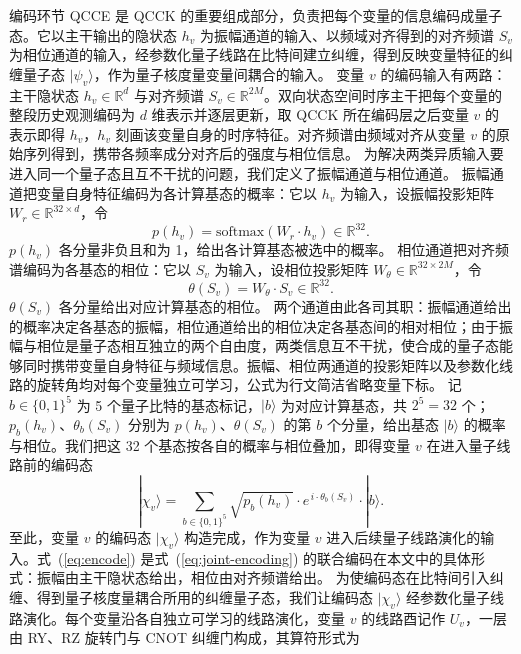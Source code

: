 编码环节 QCCE 是 QCCK 的重要组成部分，负责把每个变量的信息编码成量子态。它以主干输出的隐状态 $h_v$ 为振幅通道的输入、以频域对齐得到的对齐频谱 $S_v$ 为相位通道的输入，经参数化量子线路在比特间建立纠缠，得到反映变量特征的纠缠量子态 $|\psi_v\rangle$，作为量子核度量变量间耦合的输入。
变量 $v$ 的编码输入有两路：主干隐状态 $h_v\in\mathbb{R}^d$ 与对齐频谱 $S_v\in\mathbb{R}^{2M}$。双向状态空间时序主干把每个变量的整段历史观测编码为 $d$ 维表示并逐层更新，取 QCCK 所在编码层之后变量 $v$ 的表示即得 $h_v$，$h_v$ 刻画该变量自身的时序特征。对齐频谱由频域对齐从变量 $v$ 的原始序列得到，携带各频率成分对齐后的强度与相位信息。
为解决两类异质输入要进入同一个量子态且互不干扰的问题，我们定义了振幅通道与相位通道。
振幅通道把变量自身特征编码为各计算基态的概率：它以 $h_v$ 为输入，设振幅投影矩阵 $W_r\in\mathbb{R}^{32\times d}$，令
\begin{equation}
\label{eq:amp-channel}
p(h_v) = \mathrm{softmax}(W_r\cdot h_v) \in \mathbb{R}^{32}.
\end{equation}
$p(h_v)$ 各分量非负且和为 1，给出各计算基态被选中的概率。
相位通道把对齐频谱编码为各基态的相位：它以 $S_v$ 为输入，设相位投影矩阵 $W_\theta\in\mathbb{R}^{32\times 2M}$，令
\begin{equation}
\label{eq:phase-channel}
\theta(S_v) = W_\theta\cdot S_v \in \mathbb{R}^{32}.
\end{equation}
$\theta(S_v)$ 各分量给出对应计算基态的相位。
两个通道由此各司其职：振幅通道给出的概率决定各基态的振幅，相位通道给出的相位决定各基态间的相对相位；由于振幅与相位是量子态相互独立的两个自由度，两类信息互不干扰，使合成的量子态能够同时携带变量自身特征与频域信息。振幅、相位两通道的投影矩阵以及参数化线路的旋转角均对每个变量独立可学习，公式为行文简洁省略变量下标。
记 $b\in\{0,1\}^5$ 为 5 个量子比特的基态标记，$|b\rangle$ 为对应计算基态，共 $2^5=32$ 个；$p_b(h_v)$、$\theta_b(S_v)$ 分别为 $p(h_v)$、$\theta(S_v)$ 的第 $b$ 个分量，给出基态 $|b\rangle$ 的概率与相位。我们把这 32 个基态按各自的概率与相位叠加，即得变量 $v$ 在进入量子线路前的编码态
\begin{equation}
\label{eq:encode}
|\chi_v\rangle = \sum_{b\in\{0,1\}^5} \sqrt{p_b(h_v)} \cdot e^{\,i\cdot\theta_b(S_v)} \cdot |b\rangle.
\end{equation}
至此，变量 $v$ 的编码态 $|\chi_v\rangle$ 构造完成，作为变量 $v$ 进入后续量子线路演化的输入。式~(\ref{eq:encode}) 是式~(\ref{eq:joint-encoding}) 的联合编码在本文中的具体形式：振幅由主干隐状态给出，相位由对齐频谱给出。
为使编码态在比特间引入纠缠、得到量子核度量耦合所用的纠缠量子态，我们让编码态 $|\chi_v\rangle$ 经参数化量子线路演化。每个变量沿各自独立可学习的线路演化，变量 $v$ 的线路酉记作 $U_v$，一层由 RY、RZ 旋转门与 CNOT 纠缠门构成，其算符形式为
